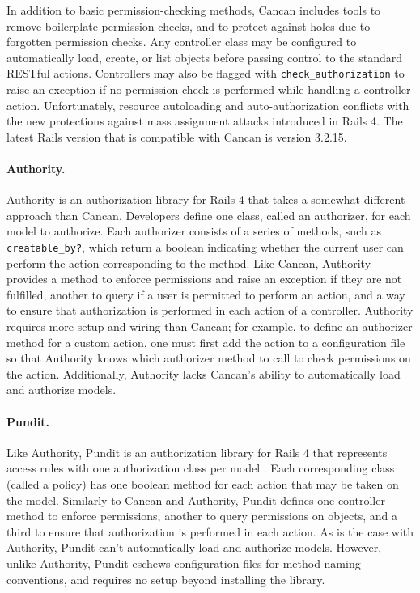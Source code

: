 \documentclass[document.tex]{subfiles}
\begin{document}
In addition to basic permission-checking methods, Cancan includes tools to remove boilerplate permission checks, and to protect against holes due to forgotten permission checks. Any controller class may be configured to automatically load, create, or list objects before passing control to the standard RESTful actions. Controllers may also be flagged with \verb!check_authorization! to raise an exception if no permission check is performed while handling a controller action. Unfortunately, resource autoloading and auto-authorization conflicts with the new protections against mass assignment attacks introduced in Rails 4. The latest Rails version that is compatible with Cancan is version 3.2.15.

\paragraph{Authority.} Authority \cite{authority} is an authorization library for Rails 4 that takes a somewhat different approach than Cancan. Developers define one class, called an authorizer, for each model to authorize. Each authorizer consists of a series of methods, such as \verb!creatable_by?!, which return a boolean indicating whether the current user can perform the action corresponding to the method. Like Cancan, Authority provides a method to enforce permissions and raise an exception if they are not fulfilled, another to query if a user is permitted to perform an action, and a way to ensure that authorization is performed in each action of a controller. Authority requires more setup and wiring than Cancan; for example, to define an authorizer method for a custom action, one must first add the action to a configuration file so that Authority knows which authorizer method to call to check permissions on the action. Additionally, Authority lacks Cancan’s ability to automatically load and authorize models.

\paragraph{Pundit.} Like Authority, Pundit is an authorization library for Rails 4 that represents access rules with one authorization class per model \cite{pundit}. Each corresponding class (called a policy) has one boolean method for each action that may be taken on the model. Similarly to Cancan and Authority, Pundit defines one controller method to enforce permissions, another to query permissions on objects, and a third to ensure that authorization is performed in each action. As is the case with Authority, Pundit can’t automatically load and authorize models. However, unlike Authority, Pundit eschews configuration files for method naming conventions, and requires no setup beyond installing the library.
\end{document}
